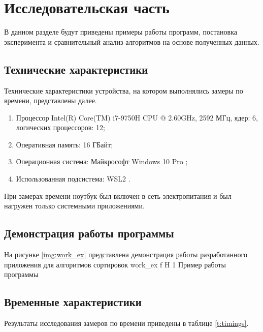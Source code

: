 \chapter{Исследовательская часть}

В данном разделе будут приведены примеры работы программ, постановка эксперимента и сравнительный анализ алгоритмов на основе полученных данных.


\section{Технические характеристики}

Технические характеристики устройства, на котором выполнялись замеры по времени, представлены далее.

\begin{enumerate}
	\item Процессор	Intel(R) Core(TM) i7-9750H CPU @ 2.60GHz, 2592 МГц, ядер: 6, логических процессоров: 12;
	\item Оперативная память: 16 ГБайт;
	\item Операционная система: Майкрософт Windows 10 Pro \cite{windows};
	\item Использованная подсистема: WSL2 \cite{WSL2}.
\end{enumerate}

При замерах времени ноутбук был включен в сеть электропитания и был нагружен только системными приложениями.



\section{Демонстрация работы программы}

На рисунке \ref{img:work_ex} представлена демонстрация работы разработанного приложения для алгоритмов сортировок
{work_ex} %
{f} %
{H} %
{1\textwidth} %
{Пример работы программы} %



\section{Временные характеристики}

Результаты исследования замеров по времени приведены в таблице \ref{t:timings}.

